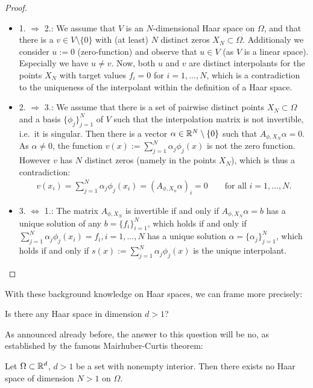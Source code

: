 \begin{proof}
\begin{itemize}
\item 1. $\Rightarrow$ 2.: We assume that $V$ is an $N$-dimensional Haar space on $\Omega$, 
and that there is a $v \in V \setminus \{ 0 \}$ with (at least) $N$ distinct zeros $X_N \subset \Omega$.
Additionaly we consider $u := 0$ (zero-function) and observe that $u \in V$ (as $V$ is a linear space).
Especially we have $u \neq v$.
Now, both $u$ and $v$ are distinct interpolants for the points $X_N$ with target values $f_i = 0$ for $i=1, ..., N$,
which is a contradiction to the uniqueness of the interpolant within the definition of a Haar space.
\item 2. $\Rightarrow$ 3.: We assume that there is a set of pairwise distinct points $X_N \subset \Omega$ and a basis $\{ \phi_j \}_{j=1}^N$ of $V$ such that the interpolation matrix is not invertible, i.e.\ it is singular.
Then there is a vector $\alpha \in \mathbb{R}^N \setminus \{ 0 \}$ such that $A_{\phi, X_N} \alpha = 0$.
As $\alpha \neq 0$, the function $v(x) := \sum_{j=1}^N \alpha_j \phi_j(x)$ is not the zero function.
However $v$ has $N$ distinct zeros (namely in the points $X_N$), which is thus a contradiction:
\begin{align*}
v(x_i) = \sum_{j=1}^N \alpha_j \phi_j(x_i) = (A_{\phi, X_n} \alpha)_i = 0 \qquad \text{for all } i=1, ..., N.
\end{align*}
\item 3. $\Leftrightarrow$ 1.: The matrix $A_{\phi, X_N}$ is invertible if and only if $A_{\phi, X_N} \alpha = b$ has a unique solution of any $b = \{f_i \}_{i=1}^N$,
which holds if and only if $\sum_{j=1}^N \alpha_j \phi_j(x_i) = f_i, i=1, ..., N$ has a unique solution $\alpha = \{ \alpha_j \}_{j=1}^N$,
which holds if and only if $s(x) := \sum_{j=1}^N \alpha_j \phi_j(x)$ is the unique interpolant.
\end{itemize}
\end{proof}

With these background knowledge on Haar spaces, we can frame  more precisely:

\begin{question}
\label{question:02}
Is there any Haar space in dimension $d>1$?
\end{question}
As announced already before, the answer to this question will be no, as established by the famous Mairhuber-Curtis theorem:


\begin{thm}
\label{th:mairhuber_curtis}
Let $\Omega \subset \mathbb{R}^d$, $d>1$ be a set with nonempty interior.
Then there exists no Haar space of dimension $N>1$ on $\Omega$.
\end{thm}

